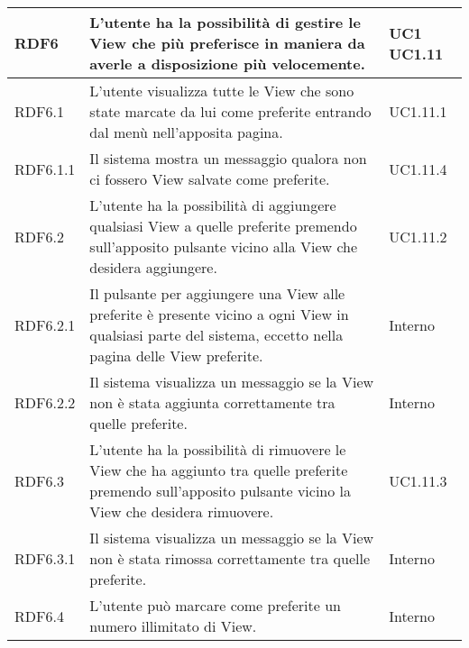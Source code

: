 \begin{center}
\begin{longtable}{| p{2.5cm} | p{8cm} | p{2cm} |}
		RDF6  & L'utente ha la possibilità di gestire le View che più preferisce in maniera da averle a disposizione più velocemente. &  UC1 \newline UC1.11 \\
		\hline
		RDF6.1  & L'utente visualizza tutte le View che sono state marcate da lui come preferite entrando dal menù nell'apposita pagina. & UC1.11.1 \\
		\hline
		RDF6.1.1  & Il sistema mostra un messaggio qualora non ci fossero View salvate come preferite. &  UC1.11.4 \\
		\hline
		RDF6.2  & L'utente ha la possibilità di aggiungere qualsiasi View a quelle preferite premendo sull'apposito pulsante vicino alla View che desidera aggiungere. & UC1.11.2 \\
		\hline
		RDF6.2.1  & Il pulsante per aggiungere una View alle preferite è presente vicino a ogni View in qualsiasi parte del sistema, eccetto nella pagina delle View preferite.  & Interno \\
		\hline
		RDF6.2.2  & Il sistema visualizza un messaggio se la View non è stata aggiunta correttamente tra quelle preferite.  & Interno \\
		\hline
		RDF6.3  & L'utente ha la possibilità di rimuovere le View che ha aggiunto tra quelle preferite premendo sull'apposito pulsante vicino la View che desidera rimuovere.  &  UC1.11.3 \\
		\hline
		RDF6.3.1  & Il sistema visualizza un messaggio se la View non è stata rimossa correttamente tra quelle preferite.  &  Interno \\
		\hline
		RDF6.4 & L'utente può marcare come preferite un numero illimitato di View. &  Interno \\
		\hline



\end{longtable}
\end{center}
